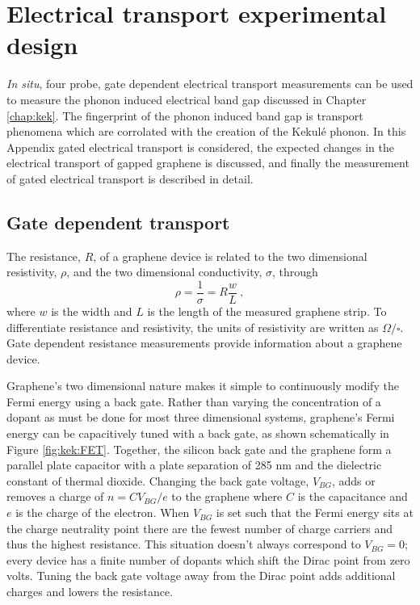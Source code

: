 \chapter{Electrical transport experimental design \label{chap:elec}}
\textit{In situ}, four probe, gate dependent electrical transport measurements can be used to measure the phonon induced electrical band gap discussed in Chapter \ref{chap:kek}.
The fingerprint of the phonon induced band gap is transport phenomena which are corrolated with the creation of the Kekul\'e phonon.
In this Appendix gated electrical transport is considered, the expected changes in the electrical transport of gapped graphene is discussed, and finally the measurement of gated electrical transport is described in detail.

\section{Gate dependent transport}
The resistance, $R$, of a graphene device is related to the two dimensional resistivity, $\rho$, and the two dimensional conductivity, $\sigma$, through
\begin{equation*}
	\rho=\frac{1}{\sigma}=R \frac{w}{L} \ ,
\end{equation*}
where $w$ is the width and $L$ is the length of the measured graphene strip.
To differentiate resistance and resistivity, the units of resistivity are written as $\Omega/\square$.
Gate dependent resistance measurements provide information about a graphene device.

Graphene's two dimensional nature makes it simple to continuously modify the Fermi energy using a back gate.
Rather than varying the concentration of a dopant as must be done for most three dimensional systems, graphene's Fermi energy can be capacitively tuned with a back gate, as shown schematically in Figure \ref{fig:kek:FET}.
Together, the silicon back gate and the graphene form a parallel plate capacitor with a plate separation of 285 nm and the dielectric constant of thermal dioxide.
Changing the back gate voltage, $V_{BG}$, adds or removes a charge of $n=CV_{BG}/e$ to the graphene where $C$ is the capacitance and $e$ is the charge of the electron.
When $V_{BG}$ is set such that the Fermi energy sits at the charge neutrality point there are the fewest number of charge carriers and thus the highest resistance.
This situation doesn't always correspond to $V_{BG}=0$; every device has a finite number of dopants which shift the Dirac point from zero volts.
Tuning the back gate voltage away from the Dirac point adds additional charges and lowers the resistance.

